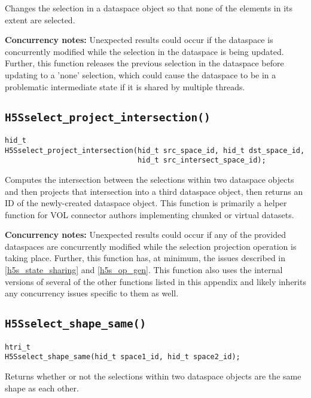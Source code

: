 \documentclass[../HDF5_RFC.tex]{subfiles}
\begin{document}
Changes the selection in a dataspace object so that none of the elements in its extent are selected.

\textbf{Concurrency notes:} Unexpected results could occur if the dataspace is concurrently
modified while the selection in the dataspace is being updated. Further, this function releases
the previous selection in the dataspace before updating to a 'none' selection, which could cause
the dataspace to be in a problematic intermediate state if it is shared by multiple threads.

\subsection{\texttt{H5Sselect\_project\_intersection()}}
\label{apdx:h5s_func_h5sselect_project_intersection}

\begin{verbatim}
hid_t
H5Sselect_project_intersection(hid_t src_space_id, hid_t dst_space_id,
                               hid_t src_intersect_space_id);
\end{verbatim}

Computes the intersection between the selections within two dataspace objects and then projects
that intersection into a third dataspace object, then returns an ID of the newly-created dataspace
object. This function is primarily a helper function for VOL connector authors implementing chunked
or virtual datasets.

\textbf{Concurrency notes:} Unexpected results could occur if any of the provided dataspaces are
concurrently modified while the selection projection operation is taking place. Further, this function
has, at minimum, the issues described in \ref{h5s_state_sharing} and \ref{h5s_op_gen}. This function
also uses the internal versions of several of the other functions listed in this appendix and likely
inherits any concurrency issues specific to them as well.

\subsection{\texttt{H5Sselect\_shape\_same()}}
\label{apdx:h5s_func_h5sselect_shape_same}

\begin{verbatim}
htri_t
H5Sselect_shape_same(hid_t space1_id, hid_t space2_id);
\end{verbatim}

Returns whether or not the selections within two dataspace objects are the same shape as each other.
\end{document}
